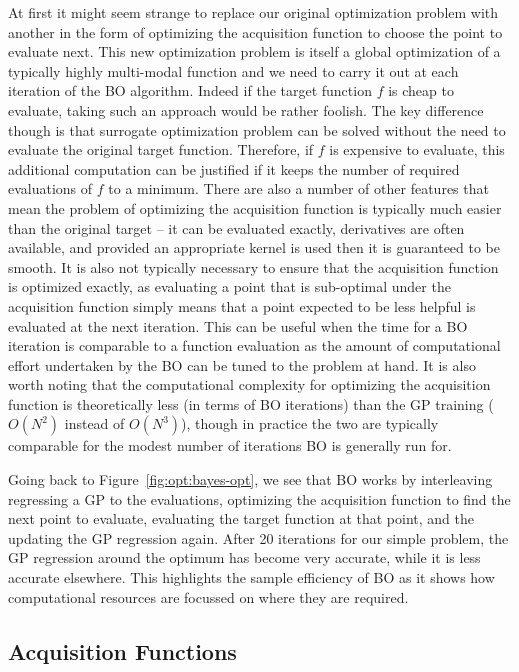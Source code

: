 At first it might seem strange to replace our original optimization problem with
another in the form of optimizing the acquisition function to choose the point
to evaluate next.  This new optimization problem is itself a global
optimization of a typically highly multi-modal function and we need to carry it out
at each iteration of the BO algorithm.  Indeed if the target function $f$ is cheap to
evaluate, taking such an approach would be rather foolish.
The key difference though
is that surrogate optimization problem can be solved without the need to evaluate
the original target function.  Therefore, if $f$ is expensive to evaluate, this additional
computation can be justified if it keeps the number of required evaluations of $f$ to
a minimum.  There are also a number of other features that mean the problem of
optimizing the acquisition function is typically much easier than the original target --
it can be evaluated exactly, derivatives are often available, and provided an appropriate kernel
is used then it is guaranteed to be smooth.  It is also not typically necessary to ensure
that the acquisition function is optimized exactly, as evaluating a point that is
sub-optimal under the acquisition function simply means that a point expected to be less
helpful is evaluated at the next iteration.  This can be useful when the time for a BO
iteration is comparable to a function evaluation as the amount of computational effort
undertaken by the BO can be tuned to the problem at hand.  It is also worth noting that
the computational complexity for optimizing the acquisition function is theoretically less
(in terms of BO iterations) than the GP training ($O(N^2)$ instead of $O(N^3)$), though in
practice the two are typically comparable for the modest number of iterations BO is
generally run for.

Going back to Figure~\ref{fig:opt:bayes-opt}, we see that BO works by interleaving
regressing a GP to the evaluations, optimizing the acquisition function to find the next
point to evaluate, evaluating the target function at that point, and the updating the GP
regression again.  After 20 iterations for our simple problem, the GP regression around
the optimum has become very accurate, while it is less accurate elsewhere.  This
highlights the sample efficiency of BO as it shows how computational resources are
focussed on where they are required.

\subsection{Acquisition Functions}
\label{sec:opt:BO:acq}

